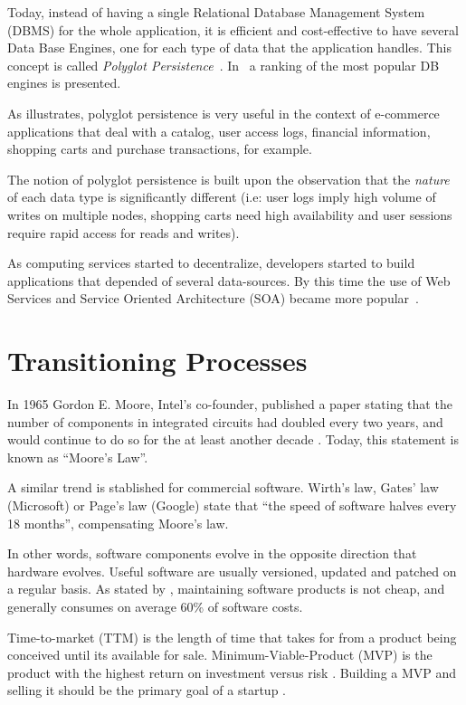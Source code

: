 Today, instead of having a single Relational Database Management System (DBMS) for the whole application, it is efficient and cost-effective to have several Data Base Engines, one for each type of data that the application handles. 
This concept is called \textit{Polyglot Persistence}~\cite{sadalage2012nosql}. In~\cite{dbranking} a ranking of the most popular DB engines is presented.

As \cite{AdressingDataManagementCloud} illustrates, polyglot persistence is very useful in the context of  e-commerce applications that deal with a catalog, user access logs, financial information, shopping carts and purchase transactions, for example.

The notion of polyglot persistence is built upon the observation that the \textit{nature} of each data type is significantly different (i.e: user logs imply high volume of writes on multiple nodes, shopping carts need high availability and user sessions require rapid access for reads and writes). 

As computing services started to decentralize, developers started to build applications that depended of several data-sources. 
By this time the use of Web Services and Service Oriented Architecture (SOA) became more popular~\cite{Armbrust09m.:above}. 



\section{Transitioning Processes}

In 1965 Gordon E. Moore, Intel's co-founder, published a paper stating that the number of components in integrated circuits had doubled every two years, and would continue to do so for the at least another decade \cite{658762}. Today, this statement is known as ``Moore's Law''.

A similar trend is stablished for commercial software. Wirth's law, Gates' law (Microsoft) or Page's law (Google) state that ``the speed of software halves every 18 months'', compensating Moore's law. \cite{wirth1995a}\cite{brinbreaking}

In other words, software components evolve in the opposite direction that hardware evolves. Useful software are usually versioned, updated and patched on a regular basis. As stated by \cite{922739}, maintaining software products is not cheap, and generally consumes on average 60\% of software costs.

Time-to-market (TTM) is the length of time that takes for from a product being conceived until its available for sale. Minimum-Viable-Product (MVP) is the product with the highest return on investment versus risk \cite{blank2013four}. Building a MVP and selling it should be the primary goal of a startup \cite{blank2013four}. 


